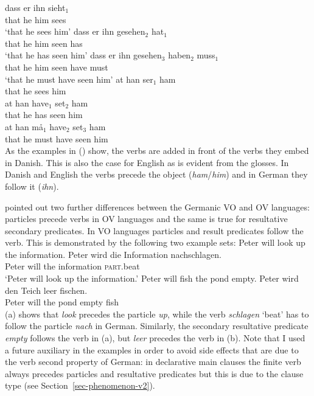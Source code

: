 \eal
\ex
\gll dass er ihn sieht$_1$\\
     that he him sees\\
\glt `that he sees him'
\ex
\gll dass er ihn gesehen$_2$ hat$_1$\\
     that he him seen        has\\
\glt `that he has seen him'
\ex
\gll dass er ihn gesehen$_3$ haben$_2$ muss$_1$\\
     that he him seen        have     must\\
\glt `that he must have seen him'
\zl
\eal
\ex
\gll at   han ser$_1$ ham\\
     that he  sees    him\\
\ex
\gll at   han have$_1$ set$_2$ ham\\
     that he  has      seen    him\\
\ex
\gll at   han må$_1$ have$_2$ set$_3$ ham\\
     that he  must   have     seen   him\\
\zl
%
As the examples in () show, the verbs are added in front of the verbs they embed in
Danish. This is also the case for English as is evident from the glosses. In Danish and English the
verbs precede the object (\emph{ham}/\emph{him}) and in German they follow it (\emph{ihn}). 

\citet{Haider2017b-u} pointed out two further differences between the Germanic VO and OV languages:
particles precede verbs in OV languages and the same is true for resultative secondary
predicates. In VO languages particles and result predicates follow the verb. This is demonstrated by
the following two example sets:
\eal
\ex Peter will look up the information.
\ex 
\gll Peter wird die Information nachschlagen.\\
     Peter will the information \textsc{part}.beat\\
\glt `Peter will look up the information.'
\zl
\eal
\ex Peter will fish the pond empty.
\ex 
\gll Peter wird den Teich leer fischen.\\
     Peter will the pond  empty fish\\
\zl
(a) shows that \emph{look} precedes the particle \emph{up}, while the verb \emph{schlagen}
`beat' has to follow the particle \emph{nach} in German. Similarly, the secondary resultative
predicate \emph{empty} follows the verb in (a), but \emph{leer} precedes the verb in
(b). Note that I used a future auxiliary in the examples in order to avoid side effects that
are due to the verb second property of German: in declarative main clauses the finite verb always
precedes particles and resultative predicates but this is due to the clause type (see Section~\ref{sec-phenomenon-v2}).

